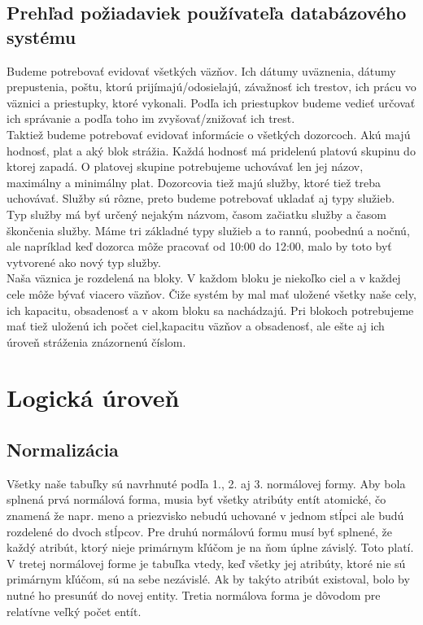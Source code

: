 \documentclass[slovak, 12pt, Times New Roman]{article}
\begin{document}
		\subsection{Prehľad požiadaviek používateľa databázového systému}
			Budeme potrebovať evidovať všetkých väzňov. Ich dátumy uväznenia, dátumy prepustenia, poštu, ktorú prijímajú/odosielajú, závažnosť 
			ich trestov, ich prácu vo väznici a priestupky, ktoré vykonali. Podľa ich priestupkov budeme vedieť určovať ich správanie a podľa 
			toho im zvyšovať/znižovať ich trest. \\
			Taktiež budeme potrebovať evidovať informácie o všetkých dozorcoch. Akú majú hodnosť, plat a aký blok strážia. Každá hodnosť má 
			pridelenú platovú skupinu do ktorej zapadá. O platovej skupine potrebujeme uchovávať len jej názov, maximálny a minimálny plat. 
			Dozorcovia tiež majú služby, ktoré tiež treba uchovávať. Služby sú rôzne, preto budeme potrebovať ukladať aj typy služieb. Typ 
			služby má byť určený nejakým názvom, časom začiatku služby a časom škončenia služby. Máme tri základné typy služieb a to rannú, 
			poobednú a nočnú, ale napríklad keď dozorca môže pracovať od 10:00 do 12:00, malo by toto byť vytvorené ako nový typ služby.	\\
			Naša väznica je rozdelená na bloky. V každom bloku je niekoľko ciel a v každej cele môže bývať viacero väzňov. Čiže systém by mal 
			mať uložené všetky naše cely, ich kapacitu, obsadenosť a v akom bloku sa nachádzajú. Pri blokoch potrebujeme mať tiež uloženú ich počet ciel,kapacitu väzňov a obsadenosť, ale 
			ešte aj ich úroveň stráženia znázornenú číslom. 
	\section{Logická úroveň}
		\subsection{Normalizácia}
			Všetky naše tabuľky sú navrhnuté podľa 1., 2. aj 3. normálovej formy. Aby bola splnená prvá normálová forma, musia byť všetky 
			atribúty entít atomické, čo znamená že napr. meno a priezvisko nebudú uchované v jednom stĺpci ale budú rozdelené do dvoch stĺpcov. 
			Pre druhú normálovú formu musí byť splnené, že každý atribút, ktorý nieje primárnym kľúčom je na ňom úplne závislý. Toto platí. V tretej normálovej forme je tabuľka vtedy, keď všetky jej atribúty, ktoré nie sú primárnym kľúčom, sú na sebe nezávislé. Ak by takýto atribút existoval, bolo by nutné ho presunúť do novej entity. Tretia normálova forma je dôvodom pre relatívne veľký počet entít.
\end{document}
